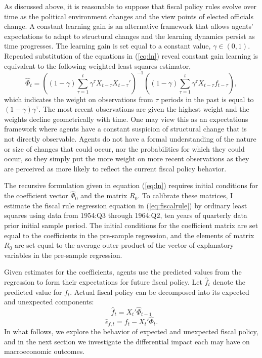 \documentclass[12pt]{article}
\newcommand{\beq}{\begin{equation}}
\newcommand{\eeq}{\end{equation}}
\begin{document}
As discussed above, it is reasonable to suppose that fiscal policy rules evolve over time as the political environment changes and the view points of elected officials change.  A constant learning gain is an alternative framework that allows agents' expectations to adapt to structural changes and the learning dynamics persist as time progresses.  The learning gain is set equal to a constant value, $\gamma \in (0,1)$.  Repeated substitution of the equations in (\ref{eq:ln}) reveal constant gain learning is equivalent to the following weighted least squares estimator,
\beq \label{eq:wls} \hat{\Phi}_t = \left( (1-\gamma)  \sum_{\tau=1}^{t} \gamma^{\tau} X_{t-\tau} X_{t-\tau}' \right)^{-1}  \left( (1-\gamma)  \sum_{\tau=1}^{t} \gamma^{\tau} X_{t-\tau}  f_{t-\tau} \right), \eeq
which indicates the weight on observations from $\tau$ periods in the past is equal to $\mbox{$(1-\gamma)\gamma^{\tau}$}$.  The most recent observations are given the highest weight and the weights decline geometrically with time.  One may view this as an expectations framework where agents have a constant suspicion of structural change that is not directly observable.  Agents do not have a formal understanding of the nature or size of changes that could occur, nor the probabilities for which they could occur, so they simply put the more weight on more recent observations as they are perceived as more likely to reflect the current fiscal policy behavior.

The recursive formulation given in equation (\ref{eq:ln}) requires initial conditions for the coefficient vector $\hat{\Phi}_0$ and the matrix $R_0$.  To calibrate these matrices, I estimate the fiscal rule regression equation in (\ref{eq:fiscalrule}) by ordinary least squares using data from 1954:Q3 through 1964:Q2, ten years of quarterly data prior initial sample period.  The initial conditions for the coefficient matrix are set equal to the coefficients in the pre-sample regression, and the elements of matrix $R_0$ are set equal to the average outer-product of the vector of explanatory variables in the pre-sample regression.

Given estimates for the coefficients, agents use the predicted values from the regression to form their expectations for future fiscal policy.  Let $\hat{f}_t$ denote the predicted value for $f_t$.  Actual fiscal policy can be decomposed into its expected and unexpected components:
\beq \hat{f}_t = X_t' \hat{\Phi}_{t-1} \eeq
\beq \hat{\epsilon}_{f,t} = f_t - X_t' \hat{\Phi}_t. \eeq
In what follows, we explore the behavior of expected and unexpected fiscal policy, and in the next section we investigate the differential impact each may have on macroeconomic outcomes.
\end{document}
